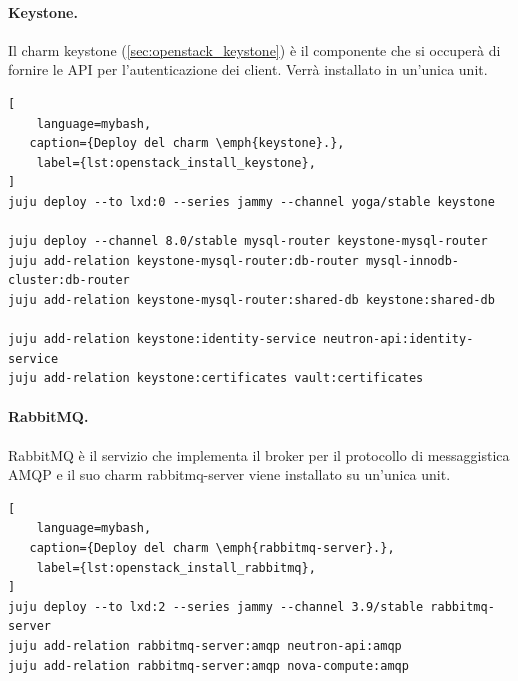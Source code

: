 \paragraph{Keystone.}
Il charm keystone (\cref{sec:openstack_keystone}) è il componente che si occuperà di fornire le API per l'autenticazione dei client.
% 
Verrà installato in un'unica unit.
% 
\begin{lstlisting}[
    language=mybash, 
   caption={Deploy del charm \emph{keystone}.},
    label={lst:openstack_install_keystone},
]
juju deploy --to lxd:0 --series jammy --channel yoga/stable keystone

juju deploy --channel 8.0/stable mysql-router keystone-mysql-router
juju add-relation keystone-mysql-router:db-router mysql-innodb-cluster:db-router
juju add-relation keystone-mysql-router:shared-db keystone:shared-db

juju add-relation keystone:identity-service neutron-api:identity-service
juju add-relation keystone:certificates vault:certificates
\end{lstlisting}



\paragraph{RabbitMQ.}
RabbitMQ è il servizio che implementa il broker per il protocollo di messaggistica AMQP e il suo charm rabbitmq-server viene installato su un'unica unit.
\begin{lstlisting}[
    language=mybash, 
   caption={Deploy del charm \emph{rabbitmq-server}.},
    label={lst:openstack_install_rabbitmq},
]
juju deploy --to lxd:2 --series jammy --channel 3.9/stable rabbitmq-server
juju add-relation rabbitmq-server:amqp neutron-api:amqp
juju add-relation rabbitmq-server:amqp nova-compute:amqp
\end{lstlisting}



